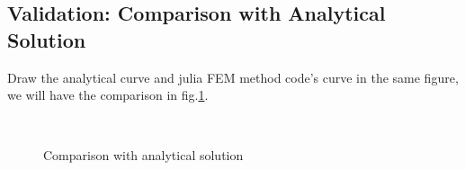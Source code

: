 \subsection{Validation: Comparison with Analytical Solution}

Draw the analytical curve and julia FEM method code's curve in the same figure, 
we will have the comparison in fig.\ref{Comparison with analytical solution}.

\begin{figure}[H]
    \centering
    \\
    \caption{Comparison with analytical solution}
    \label{Comparison with analytical solution}
\end{figure}